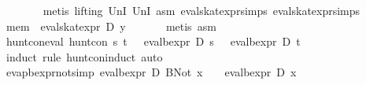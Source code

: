\begin{isabellebody}
\ \ \ \ \ \ \isamarkupfalse%
\ {}metis\ {}lifting{}\ UnI{}\ UnI{}\ asm{}\ eval{}skat{}expr{}simps{}{}{}\ eval{}skat{}expr{}simps{}{}{}{}\isanewline
\ \ \isamarkupfalse%
\isanewline
\ \ \isamarkupfalse%
\ {}mem\ {}\ eval{}skat{}expr\ D\ y\ {}{}\isanewline
\ \ \ \ \isamarkupfalse%
\ {}metis\ asm{}{}\isanewline
{}\isamarkupfalse%
%
\endisatagproof
{\isafoldproof}%
%
\isadelimproof
\isanewline
%
\endisadelimproof
\isanewline
{}\isamarkupfalse%
\ hunt{}con{}eval{}\ {}hunt{}con\ s\ t\ {}\ {}{}{}\ eval{}bexpr\ D\ s\ {}\ {}\ eval{}bexpr\ D\ t\ {}{}\isanewline
%
\isadelimproof
\ \ %
\endisadelimproof
%
\isatagproof
{}\isamarkupfalse%
\ {}induct\ rule{}\ hunt{}con{}induct{}\ auto{}%
\endisatagproof
{\isafoldproof}%
%
\isadelimproof
\isanewline
%
\endisadelimproof
\isanewline
{}\isamarkupfalse%
\ evap{}bexpr{}not{}simp{}{}\ {}eval{}bexpr\ D\ {}BNot\ x{}\ {}\ {}\ {}{}\ eval{}bexpr\ D\ x\ {}{}{}%

\end{isabellebody}
